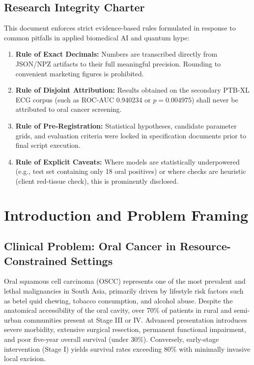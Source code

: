 \documentclass[11pt,a4paper]{report}
\begin{document}
\section*{Research Integrity Charter}
This document enforces strict evidence-based rules formulated in response to common pitfalls in applied biomedical AI and quantum hype:
\begin{enumerate}
  \item \textbf{Rule of Exact Decimals:} Numbers are transcribed directly from JSON/NPZ artifacts to their full meaningful precision. Rounding to convenient marketing figures is prohibited.
  \item \textbf{Rule of Disjoint Attribution:} Results obtained on the secondary PTB-XL ECG corpus (such as ROC-AUC 0.940234 or $p = 0.004975$) shall never be attributed to oral cancer screening.
  \item \textbf{Rule of Pre-Registration:} Statistical hypotheses, candidate parameter grids, and evaluation criteria were locked in specification documents prior to final script execution.
  \item \textbf{Rule of Explicit Caveats:} Where models are statistically underpowered (e.g., test set containing only 18 oral positives) or where checks are heuristic (client red-tissue check), this is prominently disclosed.
\end{enumerate}

\newpage
{}

\chapter{Introduction and Problem Framing}

\section{Clinical Problem: Oral Cancer in Resource-Constrained Settings}
Oral squamous cell carcinoma (OSCC) represents one of the most prevalent and lethal malignancies in South Asia, primarily driven by lifestyle risk factors such as betel quid chewing, tobacco consumption, and alcohol abuse. Despite the anatomical accessibility of the oral cavity, over 70\% of patients in rural and semi-urban communities present at Stage III or IV. Advanced presentation introduces severe morbidity, extensive surgical resection, permanent functional impairment, and poor five-year overall survival (under 30\%). Conversely, early-stage intervention (Stage I) yields survival rates exceeding 80\% with minimally invasive local excision.
\end{document}
